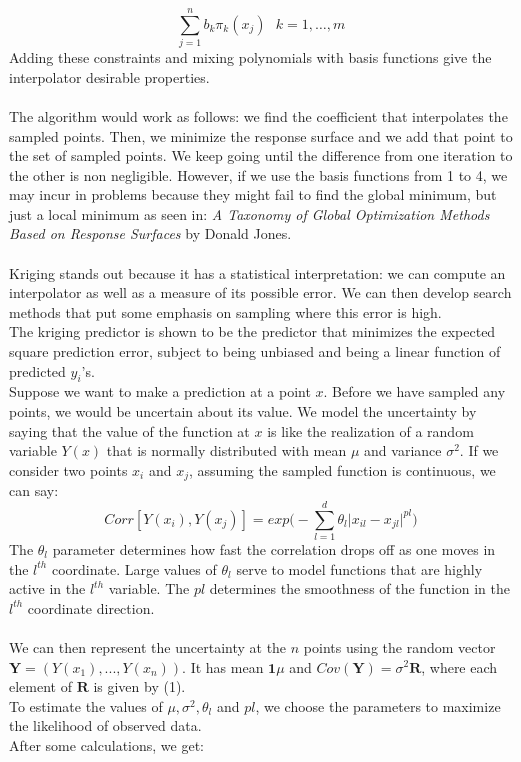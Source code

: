 \documentclass[11pt,a4paper,oneside,titlepage,openright]{book}
\begin{document}
$$ \sum_{j=1}^n b_k \pi_k(x_j) \text{  } k= 1,\ldots,m $$
Adding these constraints and mixing polynomials with basis functions give the interpolator desirable properties.\\\\
The algorithm would work as follows: we find the coefficient that interpolates the sampled points. Then, we minimize the response surface and we add that point to the set of sampled points. We keep going until the difference from one iteration to the other is non negligible. 
However, if we use the basis functions from 1 to 4, we may incur in problems because they might fail to find the global minimum, but just a local minimum as seen in: \textit{A Taxonomy of Global Optimization Methods Based on Response Surfaces} by Donald Jones.\\\\
Kriging stands out because it has a statistical interpretation: we can compute an interpolator as well as a measure of its possible error.
We can then develop search methods that put some emphasis on sampling where this error is high. \\
The kriging predictor is shown to be the predictor that minimizes the expected square prediction error, subject to being unbiased and being a linear function of predicted $y_i$'s.\\
Suppose we want to make a prediction at a point $x$. Before we have sampled any points, we would be uncertain about its value. We model the uncertainty by saying that the value of the function at $x$ is like the realization of a random variable $Y(x)$ that is normally
distributed with mean $\mu$ and variance $\sigma^2$. If we consider two points $x_i$ and $x_j$, assuming the sampled function is continuous, we can say: 
\begin{equation}
Corr[Y(x_i),Y(x_j)] = exp\Big( - \sum_{l=1}^d \theta_l \vert x_{il} - x_{jl} \vert^{pl}\Big)
\end{equation}
The $\theta_l$ parameter determines how fast the correlation drops off as one moves in the $l^{th}$ coordinate. Large values of $\theta_l$ serve to model functions that are highly active in the $l^{th}$ variable. The $pl$ determines the smoothness of the function in the  $l^{th}$ coordinate direction.\\\\
We can then represent the uncertainty at the $n$ points using the random vector $\mathbf{Y} = ( Y(x_1), ... , Y(x_n))$.
It has mean $\mathbf{1}\mu$ and $Cov(\mathbf{Y}) = \sigma^2 \mathbf{R}$, where each element of $\mathbf{R}$ is given by (1). \\
To estimate the values of $\mu, \sigma^2, \theta_l$ and $pl$, we choose the parameters to maximize the likelihood of observed data. \\
After some calculations, we get:
\end{document}
